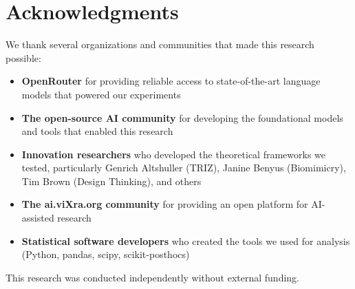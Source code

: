 \documentclass[12pt]{article}
\begin{document}
\section*{Acknowledgments}

We thank several organizations and communities that made this research possible:

\begin{itemize}
\item \textbf{OpenRouter} for providing reliable access to state-of-the-art language models that powered our experiments
\item \textbf{The open-source AI community} for developing the foundational models and tools that enabled this research
\item \textbf{Innovation researchers} who developed the theoretical frameworks we tested, particularly Genrich Altshuller (TRIZ), Janine Benyus (Biomimicry), Tim Brown (Design Thinking), and others
\item \textbf{The ai.viXra.org community} for providing an open platform for AI-assisted research
\item \textbf{Statistical software developers} who created the tools we used for analysis (Python, pandas, scipy, scikit-posthocs)
\end{itemize}

This research was conducted independently without external funding.
\end{document}
